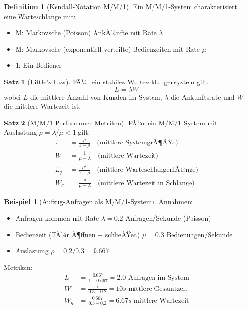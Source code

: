 ﻿\documentclass[a4paper,12pt]{report}
\theoremstyle{definition}
\newtheorem{definition}{Definition}[section]
\newtheorem{beispiel}{Beispiel}[section]
\newtheorem{satz}{Satz}[section]
\begin{document}
\begin{definition}[Kendall-Notation M/M/1]
	Ein M/M/1-System charakterisiert eine Warteschlange mit:
	\begin{itemize}
		\item[-] M: Markovsche (Poisson) AnkÃ¼nfte mit Rate $\lambda$
		\item[-] M: Markovsche (exponentiell verteilte) Bedienzeiten mit Rate $\mu$
		\item[-] 1: Ein Bediener
	\end{itemize}
\end{definition}

\begin{satz}[Little's Law]
	FÃ¼r ein stabiles Warteschlangensystem gilt:
	\[
	L = \lambda W
	\]
	wobei $L$ die mittlere Anzahl von Kunden im System, $\lambda$ die Ankunftsrate und $W$ die mittlere Wartezeit ist.
\end{satz}

\begin{satz}[M/M/1 Performance-Metriken]
	FÃ¼r ein M/M/1-System mit Auslastung $\rho = \lambda/\mu < 1$ gilt:
	\begin{align}
		L &= \frac{\rho}{1-\rho} \quad \text{(mittlere SystemgrÃ¶ÃŸe)} \\
		W &= \frac{1}{\mu - \lambda} \quad \text{(mittlere Wartezeit)} \\
		L_q &= \frac{\rho^2}{1-\rho} \quad \text{(mittlere WarteschlangenlÃ¤nge)} \\
		W_q &= \frac{\rho}{\mu - \lambda} \quad \text{(mittlere Wartezeit in Schlange)}
	\end{align}
\end{satz}

\begin{beispiel}[Aufzug-Anfragen als M/M/1-System]
	Annahmen:
	\begin{itemize}
		\item[-] Anfragen kommen mit Rate $\lambda = 0.2$ Anfragen/Sekunde (Poisson)
		\item[-] Bedienzeit (TÃ¼r Ã¶ffnen + schlieÃŸen) $\mu = 0.3$ Bedienungen/Sekunde
		\item[-] Auslastung $\rho = 0.2/0.3 = 0.667$
	\end{itemize}
	
	Metriken:
	\begin{align*}
		L &= \frac{0.667}{1-0.667} = 2.0 \text{ Anfragen im System} \\
		W &= \frac{1}{0.3 - 0.2} = 10s \text{ mittlere Gesamtzeit} \\
		W_q &= \frac{0.667}{0.3 - 0.2} = 6.67s \text{ mittlere Wartezeit}
	\end{align*}
\end{beispiel}
\end{document}

